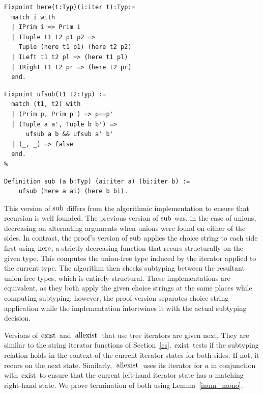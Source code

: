 \documentclass[a4paper,english]{lipics-v2019}
\renewcommand{\c}[1]{\ensuremath{\text{\lstinline{#1}}}\xspace}
\begin{document}
\medskip

\noindent
\begin{minipage}{0.53\textwidth}
\begin{lstlisting}
Fixpoint here(t:Typ)(i:iter t):Typ:=
  match i with
  | IPrim i => Prim i
  | ITuple t1 t2 p1 p2 => 
    Tuple (here t1 p1) (here t2 p2)
  | ILeft t1 t2 pl => (here t1 pl)
  | IRight t1 t2 pr => (here t2 pr)
  end.
\end{lstlisting}
\end{minipage}
\begin{minipage}{0.47\textwidth}
\begin{lstlisting}[escapechar=\%]
Fixpoint ufsub(t1 t2:Typ) :=
  match (t1, t2) with
  | (Prim p, Prim p') => p==p'
  | (Tuple a a', Tuple b b') =>
      ufsub a b && ufsub a' b'
  | (_, _) => false
  end.
%
\end{lstlisting}
\end{minipage}


\begin{lstlisting}
Definition sub (a b:Typ) (ai:iter a) (bi:iter b) :=
    ufsub (here a ai) (here b bi).
\end{lstlisting}

\noindent This version of \c{sub} differs from the algorithmic implementation to
ensure that recursion is well founded. The previous version of \c{sub} was, in
the case of unions, decreasing on alternating arguments  when unions were
found on either of the sides. In contrast, the proof's version of \c{sub}
applies the choice string to each side first using \c{here}, a strictly
decreasing function that recurs structurally on the given type. This computes
the union-free type induced by the iterator applied to the current
type. The algorithm then checks subtyping between the resultant union-free
types, which is entirely structural. These implementations are equivalent, as
they both apply the given choice strings at the same places while computing
subtyping; however, the proof version separates choice string application
while the implementation intertwines it with the actual subtyping decision.

Versions of \c{exist} and \c{allexist} that use tree iterators are given
next. They are similar to the string iterator functions of Section~\ref{cs}.
\c{exist} tests if the subtyping relation holds in the context of the
current iterator states for both sides. If not, it recurs on the next
state. Similarly, \c{allexist} uses its iterator for $a$ in conjunction with
\c{exist} to ensure that the current left-hand iterator state has a matching
right-hand state. We prove termination of both using Lemma~\ref{inum_mono}.
\end{document}
